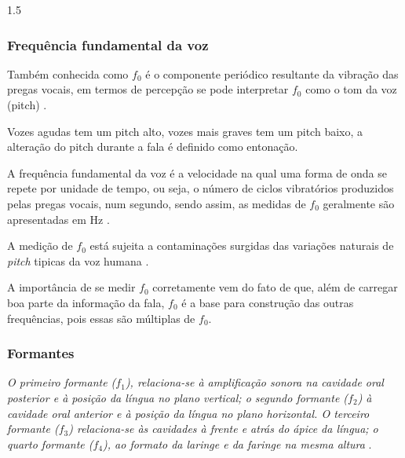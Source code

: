 \documentclass[a4paper,12pt,openright,oneside]{book}
\newenvironment{myenv}[1]
  {\begin{spacing}{#1}}
  {\end{spacing}}
\begin{document}
\begin{myenv}{1.5}
					\subsubsection{Frequência fundamental da voz}
						\par Também conhecida como $f_0$ é o componente periódico resultante da vibração das pregas vocais, em termos de percepção se pode interpretar $f_0$ como o tom da voz (pitch) \cite{kremer2014eficiencia}.
					
						\par Vozes agudas tem um pitch alto, vozes mais graves tem um pitch baixo, a alteração do pitch durante a fala é definido como entonação.
						
						\par A frequência fundamental da voz é a velocidade na qual uma forma de onda se repete
						por unidade de tempo, ou seja, o número de ciclos vibratórios produzidos pelas pregas vocais, num segundo, sendo assim, as medidas de $f_0$ geralmente são apresentadas em Hz \cite{freitas2013avaliaccao}.
					
						\par A medição de $f_0$ está sujeita a contaminações surgidas das variações naturais de \textit{pitch} tipicas da voz humana \cite{freitas2013avaliaccao}.
						
						\par A importância de se medir $f_0$ corretamente vem do fato de que, além de carregar boa parte da informação da fala, $f_0$ é a base para construção das outras frequências, pois essas são múltiplas de $f_0$.
						
						\subsubsection{Formantes}
						
						\par \textit{O primeiro formante ($f_1$), relaciona-se à  amplificação  sonora  na  cavidade  oral  posterior  e  à  posição  da  língua  no  plano  vertical;  o segundo  formante  ($f_2$)  à  cavidade  oral  anterior  e  à  posição  da  língua  no  plano  horizontal.  O terceiro  formante  ($f_3$)  relaciona-se  às  cavidades  à  frente  e  atrás  do  ápice  da  língua;  o  quarto formante  ($f_4$),  ao  formato  da  laringe  e  da  faringe  na  mesma  altura} \cite{valencca2014analise}.



\end{myenv}
\end{document}
